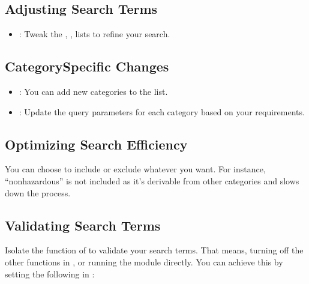 \documentclass[letterpaper,10pt,english]{sphinxmanual}
\begin{document}
\subsection{Adjusting Search Terms}
\label{\detokenize{configuration:adjusting-search-terms}}\begin{itemize}
\item {} 
\sphinxAtStartPar
{}: Tweak the , ,  lists to refine your search.

\end{itemize}


\subsection{Category\sphinxhyphen{}Specific Changes}
\label{\detokenize{configuration:category-specific-changes}}\begin{itemize}
\item {} 
\sphinxAtStartPar
{}: You can add new categories to the  list.

\item {} 
\sphinxAtStartPar
{}: Update the query parameters for each category based on your requirements.

\end{itemize}


\subsection{Optimizing Search Efficiency}
\label{\detokenize{configuration:optimizing-search-efficiency}}
\sphinxAtStartPar
You can choose to include or exclude whatever you want. For instance, “non\sphinxhyphen{}hazardous” is not included as it’s derivable from other categories and slows down the process.


\subsection{Validating Search Terms}
\label{\detokenize{configuration:validating-search-terms}}
\sphinxAtStartPar
Isolate the function of  to validate your search terms. That means, turning off the other functions in , or running the module directly. You can achieve this by setting the following in :
\end{document}
